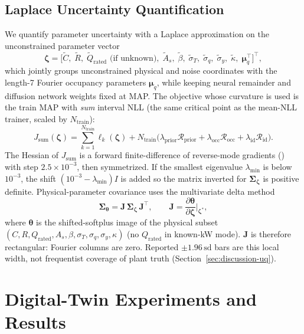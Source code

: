 \documentclass[11pt,letterpaper]{article}
\begin{document}
\subsection{Laplace Uncertainty Quantification}
\label{sec:id-uq}
We quantify parameter uncertainty with a Laplace approximation on the unconstrained parameter vector
\begin{equation}
\label{eq:zeta-vec}
\bm{\zeta} = \bigl[\tilde C,\; \tilde R,\; \tilde Q_\mathrm{rated}\text{ (if unknown)},\; \tilde A_s,\; \tilde\beta,\; \tilde\sigma_T,\; \tilde\sigma_q,\; \tilde\sigma_y,\; \tilde\kappa,\; \bm{\mu}_q^\top\bigr]^\top,
\end{equation}
which jointly groups unconstrained physical and noise coordinates with the length-7 Fourier occupancy parameters $\bm{\mu}_q$, while keeping neural remainder and diffusion network weights fixed at MAP. The objective whose curvature is used is the train MAP with \emph{sum} interval NLL (the same critical point as the mean-NLL trainer, scaled by $N_\mathrm{train}$):
\begin{equation}
\label{eq:hessian-sum}
J_{\mathrm{sum}}(\bm{\zeta}) = \sum_{k=1}^{N_\mathrm{train}} \ell_k(\bm{\zeta}) + N_\mathrm{train}\bigl(\lambda_\mathrm{prior}\mathcal{R}_\mathrm{prior} + \lambda_\mathrm{occ}\mathcal{R}_\mathrm{occ} + \lambda_\mathrm{id}\mathcal{R}_\mathrm{id}\bigr).
\end{equation}
The Hessian of $J_{\mathrm{sum}}$ is a forward finite-difference of reverse-mode gradients () with step $2.5\times 10^{-3}$, then symmetrized. If the smallest eigenvalue $\lambda_{\min}$ is below $10^{-3}$, the shift $(10^{-3}-\lambda_{\min})I$ is added so the matrix inverted for $\bm{\Sigma}_{\bm{\zeta}}$ is positive definite. Physical-parameter covariance uses the multivariate delta method
\begin{equation}
\label{eq:delta-method}
\bm{\Sigma}_{\bm{\theta}} = \bm{J}\,\bm{\Sigma}_{\bm{\zeta}}\,\bm{J}^\top, \qquad \bm{J} = \frac{\partial \bm{\theta}}{\partial \bm{\zeta}}\Big|_{\bm{\zeta}^*},
\end{equation}
where $\bm{\theta}$ is the shifted-softplus image of the physical subset $(C,R,Q_\mathrm{rated},A_s,\beta,\sigma_T,\sigma_q,\sigma_y,\kappa)$ (no $Q_\mathrm{rated}$ in known-kW mode). $\bm{J}$ is therefore rectangular: Fourier columns are zero. Reported $\pm 1.96\,\mathrm{sd}$ bars are this local width, not frequentist coverage of plant truth (Section~\ref{sec:discussion-uq}).

\section{Digital-Twin Experiments and Results}
\label{sec:results}
\end{document}
